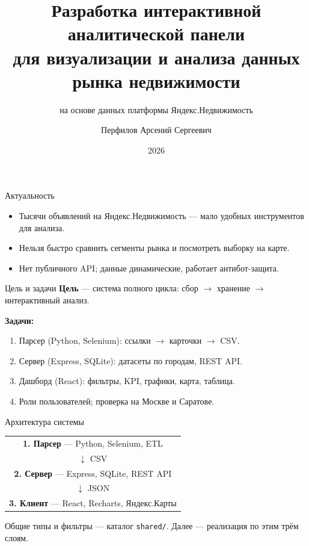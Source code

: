 \documentclass[aspectratio=169,12pt]{beamer}
\title{Разработка интерактивной аналитической панели\\для визуализации и анализа данных\\рынка недвижимости}
\subtitle{на основе данных платформы Яндекс.Недвижимость}
\author{Перфилов Арсений Сергеевич}
\institute{341 группа}
\date{2026}
\begin{document}

\begin{frame}[plain]
  \vfill
  {\Large\bfseries\inserttitle\par}
  \vspace{0.8em}
  {\normalsize\insertsubtitle\par}
  \vspace{2.2em}
  {\insertauthor\par}
  \vspace{0.4em}
  {\small\insertinstitute\par}
  \vspace{0.4em}
  {\small\insertdate\par}
  \vfill
\end{frame}

\begin{frame}{Актуальность}
  \begin{itemize}
    \item Тысячи объявлений на Яндекс.Недвижимость --- мало удобных инструментов для анализа.
    \item Нельзя быстро сравнить сегменты рынка и посмотреть выборку на карте.
    \item Нет публичного API; данные динамические, работает антибот-защита.
  \end{itemize}
\end{frame}

\begin{frame}{Цель и задачи}
  \textbf{Цель} --- система полного цикла: сбор $\rightarrow$ хранение $\rightarrow$ интерактивный анализ.

  \medskip
  \textbf{Задачи:}
  \begin{enumerate}
    \item Парсер (Python, Selenium): ссылки $\rightarrow$ карточки $\rightarrow$ CSV.
    \item Сервер (Express, SQLite): датасеты по городам, REST API.
    \item Дашборд (React): фильтры, KPI, графики, карта, таблица.
    \item Роли пользователей; проверка на Москве и Саратове.
  \end{enumerate}
\end{frame}

\begin{frame}{Архитектура системы}
  \begin{center}
    \setlength{\tabcolsep}{8pt}
    \begin{tabular}{c}
      \textbf{1. Парсер} --- Python, Selenium, ETL \\[0.3em]
      $\downarrow$ CSV \\[0.3em]
      \textbf{2. Сервер} --- Express, SQLite, REST API \\[0.3em]
      $\downarrow$ JSON \\[0.3em]
      \textbf{3. Клиент} --- React, Recharts, Яндекс.Карты \\
    \end{tabular}
  \end{center}
  \vfill
  \small Общие типы и фильтры --- каталог \texttt{shared/}. Далее --- реализация по этим трём слоям.
\end{frame}
\end{document}
